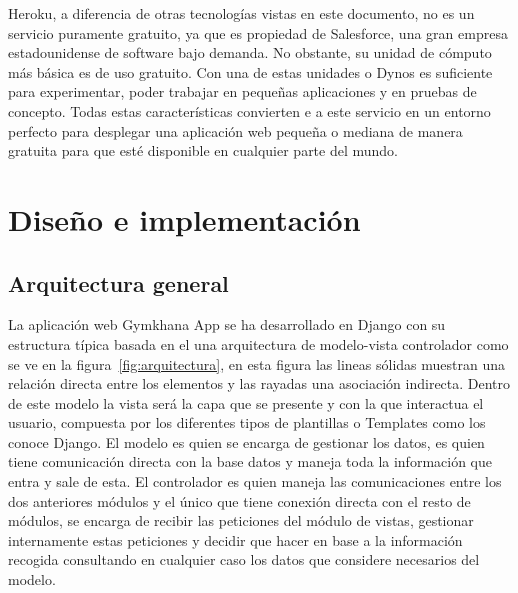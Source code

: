 \documentclass[a4paper, 12pt]{book}
\begin{document}
Heroku, a diferencia de otras tecnologías vistas en este documento, no es un servicio puramente gratuito, ya que es propiedad de Salesforce, una gran empresa estadounidense de software bajo demanda. No obstante, su unidad de cómputo más básica es de uso gratuito. Con una de estas unidades o Dynos es suficiente para experimentar, poder trabajar en pequeñas aplicaciones y en pruebas de concepto. Todas estas características convierten e a este servicio en un entorno perfecto para desplegar una aplicación web pequeña o mediana de manera gratuita para que esté disponible en cualquier parte del mundo. 




\chapter{Diseño e implementación}


\section{Arquitectura general} 
\label{sec:arquitectura}

La aplicación web Gymkhana App se ha desarrollado en Django con su estructura típica basada en el una arquitectura de modelo-vista controlador como se ve en la figura~\ref{fig:arquitectura}, en esta figura las lineas sólidas muestran una relación directa entre los elementos y las rayadas una asociación indirecta. Dentro de este modelo  la vista será la capa que se presente y con la que interactua el usuario, compuesta por los diferentes tipos de plantillas o Templates como los conoce Django. El modelo es quien se encarga de gestionar los datos, es quien tiene comunicación directa con la base datos y maneja toda la información que entra y sale de esta. El controlador es quien maneja las comunicaciones entre los dos anteriores módulos y el único que tiene conexión directa con el resto de módulos, se encarga de recibir las peticiones del módulo de vistas, gestionar internamente estas peticiones y decidir que hacer en base a la información recogida consultando en cualquier caso los datos que considere necesarios del modelo. 
\end{document}
